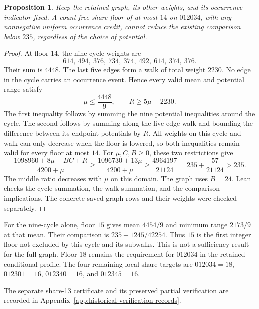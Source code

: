 \documentclass[11pt,a4paper]{article}
\newtheorem{proposition}[theorem]{Proposition}
\theoremstyle{definition}
\theoremstyle{remark}
\begin{document}
\begin{proposition}\label{prop:share-fourteen-obstruction}
Keep the retained graph, its other weights, and its occurrence indicator
fixed. A count-free share floor of at most $14$ on $012034$, with any
nonnegative uniform occurrence credit, cannot reduce the existing comparison
below $235$, regardless of the choice of potential.
\end{proposition}
\begin{proof}
At floor $14$, the nine cycle weights are
\[
614,\ 494,\ 376,\ 734,\ 374,\ 492,\ 614,\ 374,\ 376.
\]
Their sum is $4448$. The last five edges form a walk of total weight $2230$.
No edge in the cycle carries an occurrence event. Hence every valid
mean and potential range satisfy
\[
\mu\le\frac{4448}{9},\qquad R\ge5\mu-2230.
\]
The first inequality follows by summing the nine potential inequalities
around the cycle. The second follows by summing along the five-edge walk
and bounding the difference between its endpoint potentials by $R$.
All weights on this cycle and walk can only decrease when the floor is
lowered, so both inequalities remain valid for every floor at most $14$.
For $\mu,C,B\ge0$, these two restrictions give
\[
\frac{1098960+8\mu+BC+R}{4200+\mu}
\ge\frac{1096730+13\mu}{4200+\mu}
\ge\frac{4964197}{21124}
=235+\frac{57}{21124}>235.
\]
The middle ratio decreases with $\mu$ on this domain. The graph uses
$B=24$. Lean checks the cycle summation, the walk summation, and the
comparison implications. The concrete saved graph rows and their weights
were checked separately.
\end{proof}

For the nine-cycle alone, floor $15$ gives mean $4454/9$ and minimum
range $2173/9$ at that mean. Their comparison is
$235-1245/42254$. Thus $15$ is the first integer floor not excluded by this
cycle and its subwalks. This is not a sufficiency result for the full graph.
Floor $18$ remains the requirement for $012034$ in the retained
conditional profile. The four remaining local share targets are
$012034=18$, $012301=16$, $012340=16$, and $012345=16$.

The separate share-13 certificate and its preserved partial verification
are recorded in Appendix~\ref{app:historical-verification-records}.
\end{document}
